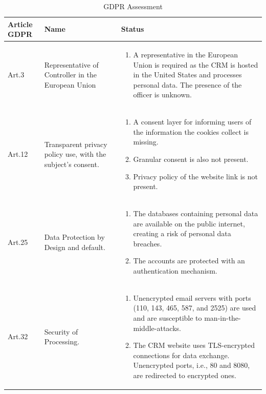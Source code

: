\begingroup
\centering
\setlength{\tabcolsep}{6.5pt} %
\renewcommand{\arraystretch}{1.8} %
\begin{longtable}{ |p{3cm}|p{5cm}| p{7cm} |}
\caption{GDPR Assessment}
    \label{table:gdpr}
\hline
\rowcolor{grey!15}
\textbf{Article GDPR} & \textbf{Name}  & \textbf{Status}\\
\hline
Art.3 & Representative of Controller in the European Union  &
\vspace{-\baselineskip}
\begin{enumerate}
    \item A representative in the European Union is required as the CRM is hosted in the United States and processes personal data. The presence of the officer is unknown.
\end{enumerate}\\
\hline
Art.12 & Transparent privacy policy use, with the subject's consent.  &  
\vspace{-\baselineskip}
\begin{enumerate}
    \item A consent layer for informing users of the information the cookies collect is missing.
    \item Granular consent is also not present.
    \item Privacy policy of the website link is not present.
\end{enumerate}\\
\hline
Art.25 & Data Protection by Design and default.  &  
\vspace{-\baselineskip}
\begin{enumerate}
    \item The databases containing personal data are available on the public internet, creating a risk of personal data breaches.
    \item The accounts are protected with an authentication mechanism.
\end{enumerate}\\
\hline
Art.32 & Security of Processing.  &  
\vspace{-\baselineskip}
\begin{enumerate}
    \item Unencrypted email servers with ports (110, 143, 465, 587, and 2525) are used and are susceptible to man-in-the- middle-attacks.
    \item The CRM website uses TLS-encrypted connections for data exchange. Unencrypted ports, i.e., 80 and 8080, are redirected to encrypted ones.  

\end{enumerate}
\end{longtable}
